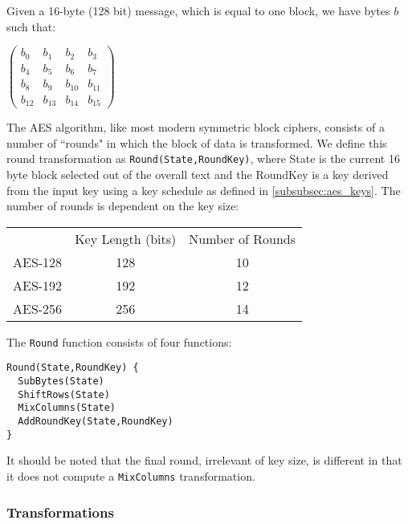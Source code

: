     Given a 16-byte (128 bit) message, which is equal to one block, we have bytes $b$ such that:
    
    \begin{center}
      $\begin{pmatrix}
        b_0 & b_1 & b_2 & b_3 \\
        b_4 & b_5 & b_6 & b_7 \\
        b_8 & b_9 & b_{10} & b_{11} \\
        b_{12} & b_{13} & b_{14} & b_{15}
      \end{pmatrix}$
    \end{center}
    
    The AES algorithm, like most modern symmetric block ciphers, consists of a number of ``rounds" in which the block of data is transformed. We define this round transformation as \verb!Round(State,RoundKey)!, where State is the current 16 byte block selected out of the overall text and the RoundKey is a key derived from the input key using a key schedule as defined in \textsection\ref{subsubsec:aes_keys}. The number of rounds is dependent on the key size:
    
   
      \begin{center}
      \begin{tabular}{r|c|c|}
        \multicolumn{1}{r}{}
         &  \multicolumn{1}{c}{Key Length (bits)}
         & \multicolumn{1}{c}{Number of Rounds} \\
        \cline{2-3}
        AES-128 & 128 & 10 \\
        \cline{2-3}
        AES-192 & 192 & 12 \\
        \cline{2-3}
        AES-256 & 256 & 14 \\
        \cline{2-3}
      \end{tabular}
      \end{center}
      
    The \verb!Round! function consists of four functions:
    
    \begin{verbatim}
Round(State,RoundKey) {
  SubBytes(State)
  ShiftRows(State)
  MixColumns(State)
  AddRoundKey(State,RoundKey)
}
\end{verbatim}

    It should be noted that the final round, irrelevant of key size, is different in that it does not compute a \verb!MixColumns! transformation.
    
    \subsubsection{Transformations}
    
